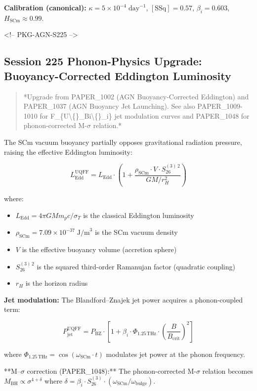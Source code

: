 \documentclass[11pt]{article}
\begin{document}
\textbf{Calibration (canonical):} $\kappa = 5 \times 10^{-4}\;\text{day}^{-1}$, $[\text{SSq}] = 0.57$, $\beta_i = 0.603$, $H_{\text{SCm}} \approx 0.99$.

<!-- PKG-AGN-S225 -->

\subsection*{Session 225 Phonon-Physics Upgrade: Buoyancy-Corrected Eddington Luminosity}

\begin{quote}
*Upgrade from PAPER\_1002 (AGN Buoyancy-Corrected Eddington) and PAPER\_1037
(AGN Buoyancy Jet Launching).  See also PAPER\_1009-1010 for F\_\{U\textbackslash\{\}\_Bi\textbackslash\{\}\_i\} jet
modulation curves and PAPER\_1048 for phonon-corrected M-$\sigma$ relation.*
\end{quote}

The SCm vacuum buoyancy partially opposes gravitational radiation pressure, raising the effective Eddington luminosity:

$$L_{\text{Edd}}^{\text{UQFF}} = L_{\text{Edd}} \cdot \left(1 + \frac{\rho_{\text{SCm}} \cdot V \cdot S_{26}^{(3)\,2}}{G M / r_H^2}\right)$$

where:

\begin{itemize}
  \item $L_{\text{Edd}} = 4\pi G M m_p c / \sigma_T$ is the classical Eddington luminosity
  \item $\rho_{\text{SCm}} = 7.09 \times 10^{-37}\;\text{J/m}^3$ is the SCm vacuum density
  \item $V$ is the effective buoyancy volume (accretion sphere)
  \item $S_{26}^{(3)\,2}$ is the squared third-order Ramanujan factor (quadratic coupling)
  \item $r_H$ is the horizon radius
\end{itemize}

\textbf{Jet modulation:} The Blandford--Znajek jet power acquires a phonon-coupled term:

$$P_{\text{jet}}^{\text{UQFF}} = P_{\text{BZ}} \cdot \left[1 + \beta_i \cdot \Phi_{1.25\,\text{THz}} \cdot \left(\frac{B}{B_{\text{crit}}}\right)^2\right]$$

where $\Phi_{1.25\,\text{THz}} = \cos(\omega_{\text{SCm}} \cdot t)$ modulates jet power at the phonon frequency.

**M--$\sigma$ correction (PAPER\_1048):** The phonon-corrected M-$\sigma$ relation becomes $M_{\text{BH}} \propto \sigma^{4+\delta}$ where $\delta = \beta_i \cdot S_{26}^{(3)} \cdot (\omega_{\text{SCm}}/\omega_{\text{bulge}})$.
\end{document}
